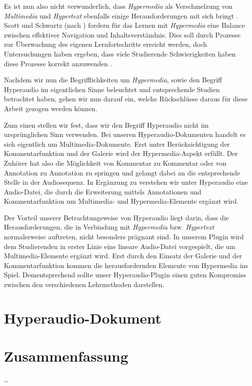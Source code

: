 Es ist nun also nicht verwunderlich, dass \textit{Hypermedia} als Verschmelzung von \textit{Multimedia} und \textit{Hypertext} ebenfalls einige Herausforderungen mit sich bringt \citep{moos2010multimedia}. Scott und Schwartz (nach \cite{moos2010multimedia}) fordern für das Lernen mit \textit{Hypermedia} eine Balance zwischen effektiver Navigation und Inhaltsverständnis. Dies soll durch Prozesse zur Überwachung des eigenen Lernfortschritts erreicht werden, doch Untersuchungen haben ergeben, dass viele Studierende Schwierigkeiten haben diese Prozesse korrekt anzuwenden \citep{moos2010multimedia}.

\label{sec:audiocues}

Nachdem wir nun die Begrifflichkeiten um \textit{Hypermedia}, sowie den Begriff Hyperaudio im eigentlichen Sinne beleuchtet und entsprechende Studien betrachtet haben, gehen wir nun darauf ein, welche Rückschlüsse daraus für diese Arbeit gezogen werden können.

Zum einen stellen wir fest, dass wir den Begriff Hyperaudio nicht im ursprünglichen Sinn verwenden. Bei unseren Hyperaudio-Dokumenten handelt es sich eigentlich um Multimedia-Dokumente. Erst unter Berücksichtigung der Kommentarfunktion und der Galerie wird der Hypermedia-Aspekt erfüllt. Der Zuhörer hat also die Möglichkeit von Kommentar zu Kommentar oder von Annotation zu Annotation zu springen und gelangt dabei an die entsprechende Stelle in der Audiosequenz. In Ergänzung zu \cite{zumbach2006learning} verstehen wir unter Hyperaudio eine Audio-Datei, die durch die Erweiterung mittels Annotationen und Kommentarfunktion um Multimedia- und Hypermedia-Elemente ergänzt wird.

Der Vorteil unserer Betrachtungsweise von Hyperaudio liegt darin, dass die Herausforderungen, die in Verbindung mit \textit{Hypermedia} bzw. \textit{Hypertext} normalerweise auftreten, nicht besonders prägnant sind. In unserem Plugin wird dem Studierenden in erster Linie eine lineare Audio-Datei vorgespielt, die um Multimedia-Elemente ergänzt wird. Erst durch den Einsatz der Galerie und der Kommentarfunktion kommen die herausfordernden Elemente von Hypermedia ins Spiel. Dementsprechend sollte unser Hyperaudio-Plugin einen guten Kompromiss zwischen den verschiedenen Lehrmethoden darstellen.


\section{Hyperaudio-Dokument}
\label{sec:hyperaudio}


\section{Zusammenfassung}
\dots